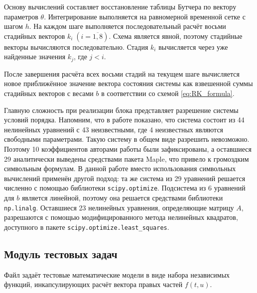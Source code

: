 Основу вычислений составляет восстановление таблицы Бутчера по вектору параметров $\theta$. Интегрирование выполняется на равномерной временной сетке с  шагом $h$. На каждом шаге выполняется последовательный расчёт восьми стадийных векторов $k_i\; (i = \overline{1, 8})$. Схема является явной, поэтому стадийные векторы вычисляются последовательно. Стадия $k_i$ вычисляется через уже найденные значения $k_j$, где $j < i$.

После завершения расчёта всех восьми стадий на текущем шаге вычисляется новое приближённое значение вектора состояния системы как взвешенной суммы стадийных векторов с весами $b$ в соответствии со схемой \eqref{eq:RK_formula}. 

Главную сложность при реализации блока представляет разрешение системы условий порядка. Напомним, что в работе \cite{Anastassi2023} показано, что система состоит из 44 нелинейных уравнений с 43 неизвестными, где 4 неизвестных являются свободными параметрами. Такую систему в общем виде разрешить невозможно. Поэтому 10 коэффициентов авторами работы были зафиксированы, а оставшиеся 29 аналитически выведены средствами пакета  Maple, что привело к громоздким символьным формулам. В данной работе вместо использования символьных вычислений применён другой подход: та же система из 29 уравнений решается численно с помощью библиотеки \texttt{scipy.optimize}. 
Подсистема из 6 уравнений для $b$ является линейной, поэтому она решается средствами библиотеки \texttt{np.linalg}. Оставшиеся 23 нелинейных уравнения, определяющие матрицу $A$, разрешаются с помощью модифицированного метода нелинейных квадратов, доступного в пакете \texttt{scipy.optimize.least\_squares}.

\subsection{Модуль тестовых задач}
Файл задаёт тестовые математические модели в виде набора независимых функций, инкапсулирующих расчёт вектора правых частей $f(t, u)$.

